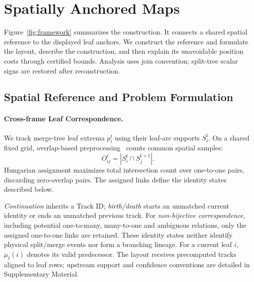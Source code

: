 \documentclass[review]{vgtc}
\begin{document}
\section{Spatially Anchored Maps}\label{sec:method}
Figure~\ref{fig:framework} summarizes the construction. It connects a shared spatial reference to the displayed leaf anchors. We construct the reference and formulate the layout, describe the construction, and then explain its unavoidable position costs through certified bounds. Analysis uses join convention; split-tree scalar signs are restored after reconstruction.

\subsection{Spatial Reference and Problem Formulation}\label{sec:reference}
\paragraph{Cross-frame Leaf Correspondence.}
We track merge-tree leaf extrema $p_i^t$ using their leaf-arc supports $S_i^t$. On a shared fixed grid, overlap-based preprocessing~\cite{STMTM:2026} counts common spatial samples:
\begin{equation}\label{eq:overlap}
 O_{ij}^t=|S_i^t\cap S_j^{t+1}|.
\end{equation}
Hungarian assignment maximizes total intersection count over one-to-one pairs, discarding zero-overlap pairs. The assigned links define the identity states described below.

\emph{Continuation} inherits a Track ID; \emph{birth/death} starts an unmatched current identity or ends an unmatched previous track. For \emph{non-bijective correspondence}, including potential one-to-many, many-to-one and ambiguous relations, only the assigned one-to-one links are retained. These identity states neither identify physical split/merge events nor form a branching lineage. For a current leaf $i$, $\mu_t(i)$ denotes its valid predecessor. The layout receives precomputed tracks aligned to leaf rows; upstream support and confidence conventions are detailed in Supplementary Material.

\end{document}

